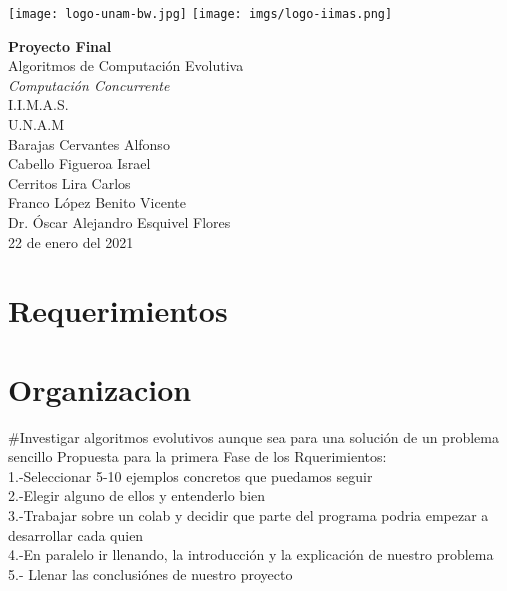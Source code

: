 \documentclass{article}
\begin{document}
\vspace{2cm}
\begin{center}
    \texttt{[image: logo-unam-bw.jpg]}
    \hspace{6cm}
    \texttt{[image: imgs/logo-iimas.png]}
\end{center}
\vspace{1cm}
\begin{center}
    \textbf{{\Huge Proyecto Final}} 
    \\ \vspace{0.5cm}
    \huge Algoritmos de Computaci\'on Evolutiva
    \\ \vspace{0.5cm}
    \textit{\Large Computaci\'on Concurrente }
    \\ \vspace{0.5cm}
    \Large I.I.M.A.S.
    \\ \vspace{0.2cm}
    \Large U.N.A.M
    \\ \vspace{1cm}
    \huge Barajas Cervantes Alfonso\\
    \huge Cabello Figueroa Israel\\
    \huge Cerritos Lira Carlos  \\
    \huge Franco López Benito Vicente
    \\ \vspace{1.2cm}
    \Large Dr. \'Oscar Alejandro Esquivel  Flores
    \\ \vspace{1cm}
    \Large 22 de enero del 2021
\end{center}
\newpage
{}
\section{Requerimientos}

\section{Organizacion}
#Investigar algoritmos evolutivos aunque sea para una solución de un problema sencillo
Propuesta para la primera Fase de los Rquerimientos:\\
1.-Seleccionar 5-10 ejemplos concretos que puedamos seguir \\
2.-Elegir alguno de ellos y entenderlo bien \\
3.-Trabajar sobre un colab y decidir que parte del programa podria empezar a desarrollar cada quien\\
4.-En paralelo ir llenando, la introducción y la explicación de nuestro problema\\
5.- Llenar las conclusiónes de nuestro proyecto\\
\end{document}
